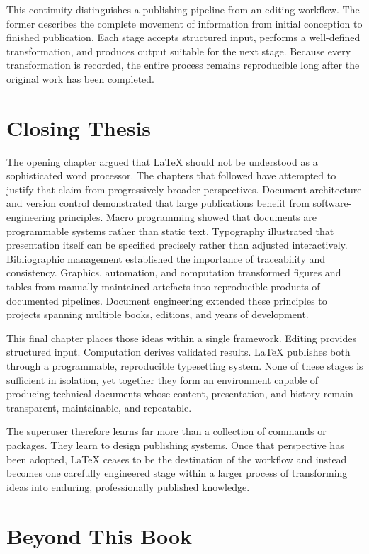 This continuity distinguishes a publishing pipeline from an editing workflow. The former describes the complete movement of information from initial conception to finished publication. Each stage accepts structured input, performs a well-defined transformation, and produces output suitable for the next stage. Because every transformation is recorded, the entire process remains reproducible long after the original work has been completed.

\hypertarget{closing-thesis}{%
\section{Closing Thesis}\label{closing-thesis}}

The opening chapter argued that LaTeX should not be understood as a sophisticated word processor. The chapters that followed have attempted to justify that claim from progressively broader perspectives. Document architecture and version control demonstrated that large publications benefit from software-engineering principles. Macro programming showed that documents are programmable systems rather than static text. Typography illustrated that presentation itself can be specified precisely rather than adjusted interactively. Bibliographic management established the importance of traceability and consistency. Graphics, automation, and computation transformed figures and tables from manually maintained artefacts into reproducible products of documented pipelines. Document engineering extended these principles to projects spanning multiple books, editions, and years of development.

This final chapter places those ideas within a single framework. Editing provides structured input. Computation derives validated results. LaTeX publishes both through a programmable, reproducible typesetting system. None of these stages is sufficient in isolation, yet together they form an environment capable of producing technical documents whose content, presentation, and history remain transparent, maintainable, and repeatable.

The superuser therefore learns far more than a collection of commands or packages. They learn to design publishing systems. Once that perspective has been adopted, LaTeX ceases to be the destination of the workflow and instead becomes one carefully engineered stage within a larger process of transforming ideas into enduring, professionally published knowledge.

\hypertarget{beyond-this-book}{%
\section{Beyond This Book}\label{beyond-this-book}}

